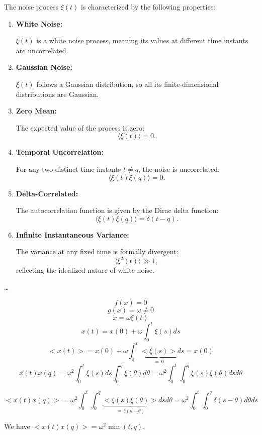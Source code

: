 The noise process $\xi(t)$ is characterized by the following properties:
\begin{enumerate}
    \item \textbf{White Noise:} 
    
    $\xi(t)$ is a white noise process, meaning its values at different time instants are uncorrelated.

    \item \textbf{Gaussian Noise:}
    
    $\xi(t)$ follows a Gaussian distribution, so all its finite-dimensional distributions are Gaussian.

    \item \textbf{Zero Mean:}
    
    The expected value of the process is zero:
    $$\langle \xi(t) \rangle = 0.$$

    \item \textbf{Temporal Uncorrelation:}
    
    For any two distinct time instants $t \neq q$, the noise is uncorrelated:
    $$\langle \xi(t)\xi(q) \rangle = 0.$$

    \item \textbf{Delta-Correlated:}
    
    The autocorrelation function is given by the Dirac delta function:
    $$\langle \xi(t)\xi(q) \rangle = \delta(t-q).$$

    \item \textbf{Infinite Instantaneous Variance:}
    
    The variance at any fixed time is formally divergent:
    $$\langle \xi^2(t) \rangle \gg 1,$$
    reflecting the idealized nature of white noise.

\end{enumerate}

\dots

$$
f(x) = 0
$$
$$
g(x) = \omega \neq 0
$$
$$
\dot x = \omega \xi(t)
$$
$$
x(t) = x(0) + \omega \int_0^t \xi(s) ds
$$
$$
<x(t)> = x(0) + \omega \int_0^t \underbrace{<\xi(s)>}_{=\ 0} ds = x(0)
$$
$$
x(t)x(q) = \omega^2 \int_0^t \xi(s) ds \int_0^q \xi(\theta) d\theta = 
\omega^2 \int_0^t \int_0^q \xi(s) \xi(\theta) ds d\theta
$$

$$
<x(t)x(q)> = \omega^2 \int_0^t \int_0^q \underbrace{<\xi(s)\xi(\theta)>}_{=\ \delta(s-\theta)} ds d\theta = \omega^2 \int_0^t \int_0^q \delta(s-\theta) d\theta ds
$$

We have $ <x(t)x(q)> = \omega^2 \min(t,q) $.

